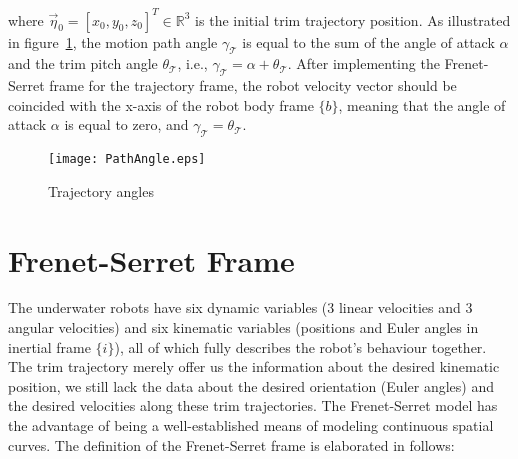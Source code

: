 where $\vec{\eta}_{0}=[x_{0},y_{0},z_{0}]^{T} \in \mathbb{R}^{3}$ is the initial trim trajectory position. 
As illustrated in figure~\ref{FIG:PathAngle}, the motion path angle $\gamma_{\mathcal{T}}$ is equal to the sum of the angle of attack $\alpha$ and the trim pitch angle $\theta_{\mathcal{T}}$, i.e., $\gamma_{\mathcal{T}}=\alpha+\theta_{\mathcal{T}}$. After implementing the Frenet-Serret frame for the trajectory frame, the robot velocity vector should be coincided with the x-axis of the robot body frame $\lbrace b \rbrace$, meaning that the angle of attack $\alpha$ is equal to zero, and $\gamma_{\mathcal{T}}=\theta_{\mathcal{T}}$.
\begin{figure}
\texttt{[image: PathAngle.eps]}
\caption{Trajectory angles}	
\label{FIG:PathAngle}
\end{figure}
\section{Frenet-Serret Frame}
The underwater robots have six dynamic variables (3 linear velocities and 3 angular velocities) and six kinematic variables (positions and Euler angles in inertial frame $\lbrace i \rbrace$), all of which fully describes the robot's behaviour together. The trim trajectory merely offer us the information about the desired kinematic position, we still lack the data about the desired orientation (Euler angles) and the desired velocities along these trim trajectories. The Frenet-Serret model has the advantage of being a well-established means of modeling continuous spatial curves. The definition of the Frenet-Serret frame is elaborated in follows: 

